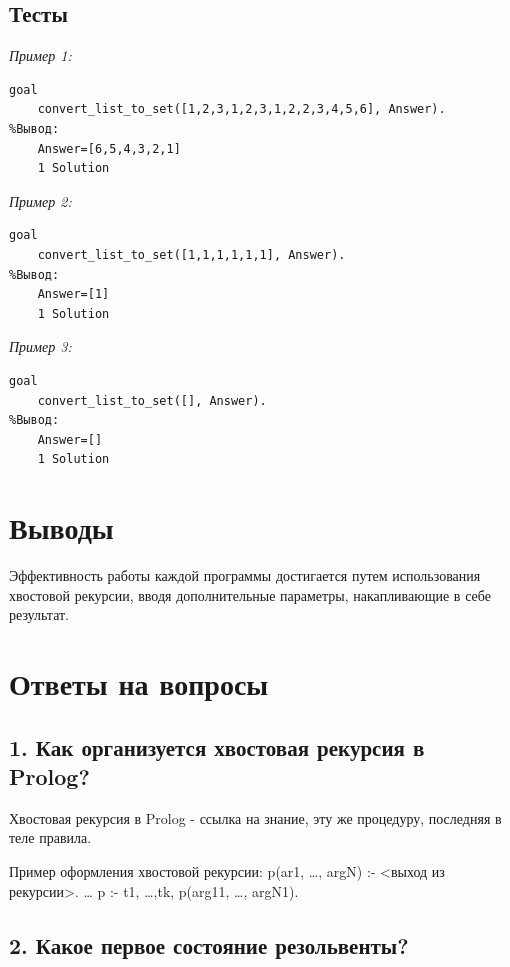 \documentclass[a4paper,12pt]{article}
\begin{document}
\subsection*{Тесты}

\textit{Пример 1:}

\begin{verbatim}
goal
	convert_list_to_set([1,2,3,1,2,3,1,2,2,3,4,5,6], Answer).
%Вывод:
	Answer=[6,5,4,3,2,1]
	1 Solution
\end{verbatim}

\textit{Пример 2:}

\begin{verbatim}
goal
	convert_list_to_set([1,1,1,1,1,1], Answer).
%Вывод:
	Answer=[1]
	1 Solution
\end{verbatim}

\textit{Пример 3:}

\begin{verbatim}
goal
	convert_list_to_set([], Answer).
%Вывод:
	Answer=[]
	1 Solution
\end{verbatim}


\section*{Выводы}

Эффективность работы каждой программы достигается путем использования хвостовой рекурсии, вводя дополнительные параметры, накапливающие в себе результат.

\newpage

\section*{Ответы на вопросы}

\subsection*{1.	Как организуется хвостовая рекурсия в Prolog? }

Хвостовая рекурсия в Prolog - ссылка на знание, эту же процедуру, 
последняя в теле правила.

Пример оформления хвостовой рекурсии:
p(ar1, …, argN) :-  <выход из рекурсии>.
…
p :- t1, …,tk, p(arg11, …, argN1).

\subsection*{2.	Какое первое состояние резольвенты?}
\end{document}
